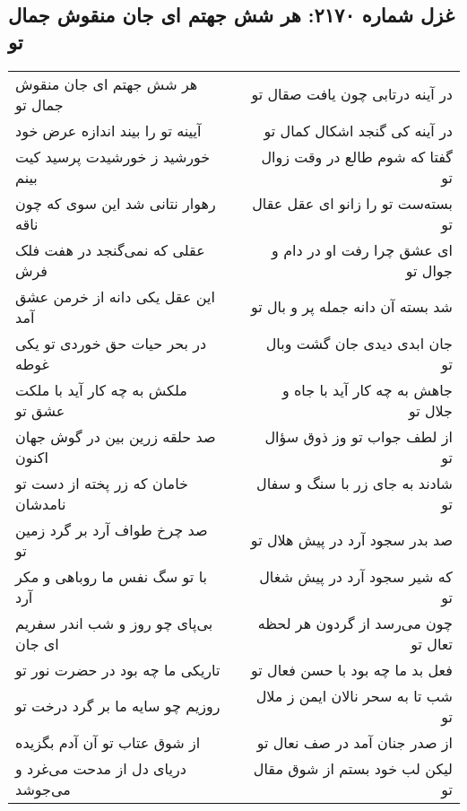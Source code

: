 \begin{center}
\section*{غزل شماره ۲۱۷۰: هر شش جهتم ای جان منقوش جمال تو}
\label{sec:2170}
\begin{longtable}{l p{0.5cm} r}
هر شش جهتم ای جان منقوش جمال تو
&&
در آینه درتابی چون یافت صقال تو
\\
آیینه تو را بیند اندازه عرض خود
&&
در آینه کی گنجد اشکال کمال تو
\\
خورشید ز خورشیدت پرسید کیت بینم
&&
گفتا که شوم طالع در وقت زوال تو
\\
رهوار نتانی شد این سوی که چون ناقه
&&
بسته‌ست تو را زانو ای عقل عقال تو
\\
عقلی که نمی‌گنجد در هفت فلک فرش
&&
ای عشق چرا رفت او در دام و جوال تو
\\
این عقل یکی دانه از خرمن عشق آمد
&&
شد بسته آن دانه جمله پر و بال تو
\\
در بحر حیات حق خوردی تو یکی غوطه
&&
جان ابدی دیدی جان گشت وبال تو
\\
ملکش به چه کار آید با ملکت عشق تو
&&
جاهش به چه کار آید با جاه و جلال تو
\\
صد حلقه زرین بین در گوش جهان اکنون
&&
از لطف جواب تو وز ذوق سؤال تو
\\
خامان که زر پخته از دست تو نامدشان
&&
شادند به جای زر با سنگ و سفال تو
\\
صد چرخ طواف آرد بر گرد زمین تو
&&
صد بدر سجود آرد در پیش هلال تو
\\
با تو سگ نفس ما روباهی و مکر آرد
&&
که شیر سجود آرد در پیش شغال تو
\\
بی‌پای چو روز و شب اندر سفریم ای جان
&&
چون می‌رسد از گردون هر لحظه تعال تو
\\
تاریکی ما چه بود در حضرت نور تو
&&
فعل بد ما چه بود با حسن فعال تو
\\
روزیم چو سایه ما بر گرد درخت تو
&&
شب تا به سحر نالان ایمن ز ملال تو
\\
از شوق عتاب تو آن آدم بگزیده
&&
از صدر جنان آمد در صف نعال تو
\\
دریای دل از مدحت می‌غرد و می‌جوشد
&&
لیکن لب خود بستم از شوق مقال تو
\\
\end{longtable}
\end{center}
